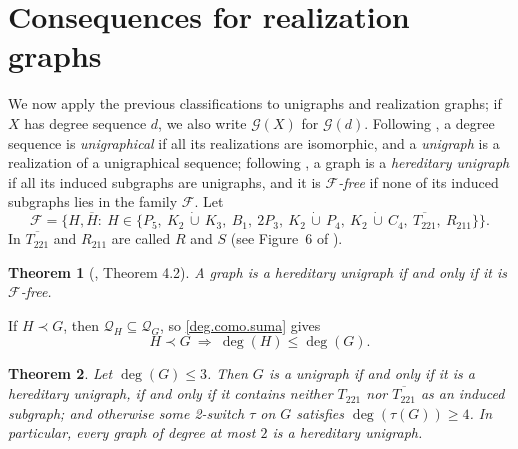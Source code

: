 \documentclass[11pt]{article}
\newtheorem{theorem}{Theorem}[section]
\begin{document}

\section{Consequences for realization graphs}
\label{sec_realization}

We now apply the previous classifications to unigraphs and realization
graphs; if $X$ has degree sequence $d$, we also write $\mathcal{G}(X)$ for
$\mathcal{G}(d)$. Following \cite{tyshkevich2000decomposition}, a degree
sequence is \emph{unigraphical} if all its realizations are isomorphic,
and a \emph{unigraph} is a realization of a unigraphical sequence;
following \cite{barrus2012switches}, a graph is a \emph{hereditary
	unigraph} if all its induced subgraphs are unigraphs, and it is
\emph{$\mathcal{F}$-free} if none of its induced subgraphs lies in the
family $\mathcal{F}$. Let
\[
\mathcal{F}=\bigl\{H,\overline{H}:\ H\in\{P_5,\ K_2\,\dot\cup\,K_3,\ B_1,\ 2P_3,\ K_2\,\dot\cup\,P_4,\ K_2\,\dot\cup\,C_4,\ \overline{T_{221}},\ R_{211}\}\bigr\}.
\]
In \cite{barrus2012switches} $\overline{T_{221}}$ and $R_{211}$ are called $R$ and
$S$ (see Figure~6 of
\cite{barrus2012switches}).

\begin{theorem}[\cite{barrus2012switches}, Theorem 4.2]
	\label{barrus.hereditarios}
	A graph is a hereditary unigraph if and only if it is $\mathcal{F}$-free.
\end{theorem}

If $H\prec G$, then $\mathcal{Q}_H\subseteq\mathcal{Q}_G$, so
\eqref{deg.como.suma} gives
\begin{equation}
	\label{deg.monotono}
	H\prec G\ \Longrightarrow\ \deg(H)\leq\deg(G).
\end{equation}

\begin{theorem}
	\label{grado<=3.unigrafo}
	Let $\deg(G)\leq 3$. Then $G$ is a unigraph if and only if it is a
	hereditary unigraph, if and only if it contains neither $T_{221}$ nor
	$\overline{T_{221}}$ as an induced subgraph; and otherwise some
	2-switch $\tau$ on $G$ satisfies $\deg(\tau(G))\geq 4$. In particular,
	every graph of degree at most $2$ is a hereditary unigraph.
\end{theorem}
\end{document}
